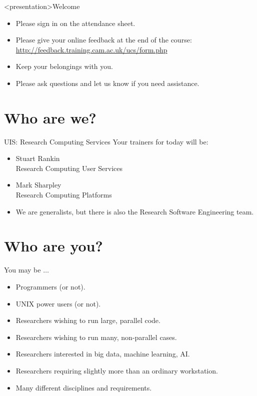 \documentclass{beamer}
\begin{document}
\begin{frame}<presentation>{Welcome}
\begin{itemize}
\item{Please sign in on the {\color{red}attendance sheet}.}
\item Please give your {\color{red}online feedback} at the end of the course:
      \url{http://feedback.training.cam.ac.uk/ucs/form.php}
\item{Keep your belongings with you.}
\item\alert{Please ask questions and let us know if you need assistance.}
\end{itemize}
\end{frame}

\section{Who are we?}
\begin{frame}{UIS: Research Computing Services}
Your trainers for today will be:\\
\begin{itemize}
\item{\alert{Stuart Rankin}\\{}\qquad\qquad Research Computing User Services}
\item{\alert{Mark Sharpley}\\{}\qquad\qquad Research Computing Platforms}
\item{We are generalists, but there is also the \alert{Research Software Engineering} team.}
\end{itemize}
\end{frame}

\section{Who are you?}
\begin{frame}{You may be $\ldots$}
  \begin{itemize}
  \item{Programmers (or not).}\pause
  \item{UNIX power users (or not).}\pause
  \item{Researchers wishing to run large, parallel code.}\pause
  \item{Researchers wishing to run many, non-parallel cases.}\pause
  \item{Researchers interested in big data, machine learning, AI.}\pause
  \item{Researchers requiring slightly more than an ordinary workstation.}\pause
  \item{\alert{Many different disciplines and requirements.}}
\end{itemize}
\end{frame}
\end{document}
